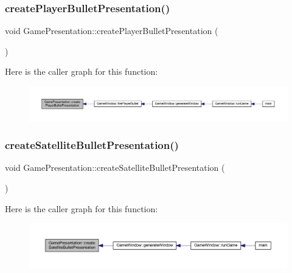 \subsubsection{\texorpdfstring{create\+Player\+Bullet\+Presentation()}{createPlayerBulletPresentation()}}
{\footnotesize\ttfamily void Game\+Presentation\+::create\+Player\+Bullet\+Presentation (\begin{DoxyParamCaption}{ }\end{DoxyParamCaption})}

Here is the caller graph for this function\+:\nopagebreak
\begin{figure}[H]
\begin{center}
\leavevmode
\includegraphics[width=350pt]{class_game_presentation_ac87927887e1afc5583036efb01ab35ca_icgraph}
\end{center}
\end{figure}
\mbox{\label{class_game_presentation_a172770f122258cba73e1dbff88d27ea5}} 
\subsubsection{\texorpdfstring{create\+Satellite\+Bullet\+Presentation()}{createSatelliteBulletPresentation()}}
{\footnotesize\ttfamily void Game\+Presentation\+::create\+Satellite\+Bullet\+Presentation (\begin{DoxyParamCaption}{ }\end{DoxyParamCaption})}

Here is the caller graph for this function\+:\nopagebreak
\begin{figure}[H]
\begin{center}
\leavevmode
\includegraphics[width=350pt]{class_game_presentation_a172770f122258cba73e1dbff88d27ea5_icgraph}
\end{center}
\end{figure}
\mbox{\label{class_game_presentation_a921823ce61d5c9a0db91098c8f055d28}} 
